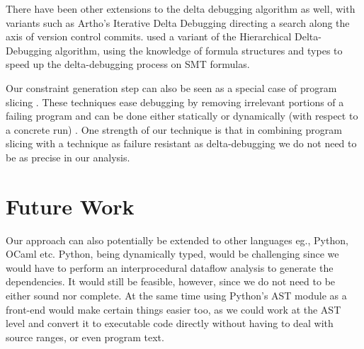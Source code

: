\documentclass[11pt]{article}
\begin{document}
There have been other extensions to the delta debugging algorithm as well, with
variants such as Artho's Iterative Delta Debugging \citep{idd} directing a search
along the axis of version control commits. \citet{smt} used a
variant of the Hierarchical Delta-Debugging algorithm, using the knowledge of
formula structures and types to speed up the delta-debugging process on SMT
formulas.

Our constraint generation step can also be seen as a special case of program
slicing \citep{weiser81} \citep{tip94}. These techniques ease debugging by
removing irrelevant portions of a failing program and can be done either
statically or dynamically (with respect to a concrete run) \citep{agrawal90}. One
strength of our technique is that in combining program slicing with a technique
as failure resistant as delta-debugging we do not need to be as precise in our
analysis.


\section{Future Work}
Our approach can also potentially be extended to other languages eg., Python,
OCaml etc. Python, being dynamically typed, would be challenging since we would
have to perform an interprocedural dataflow analysis to generate the
dependencies. It would still be feasible, however, since we do not need to be
either sound nor complete. At the same time using Python's AST module as a
front-end would make certain things easier too, as we could work at the AST
level and convert it to executable code directly without having to deal with
source ranges, or even program text.



\end{document}
